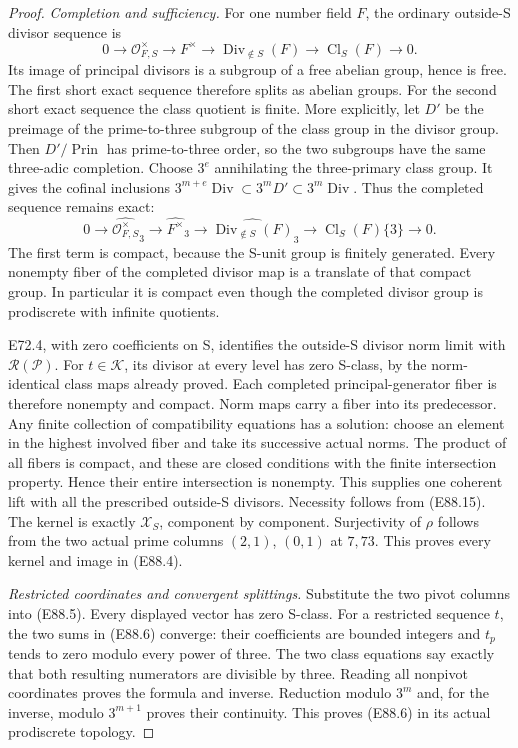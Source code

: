 \begin{proof}
\emph{Completion and sufficiency.}
For one number field $F$, the ordinary
outside-S divisor sequence is
\[
 0\longrightarrow\mathcal O_{F,S}^\times
 \longrightarrow F^\times
 \longrightarrow\operatorname{Div}_{\notin S}(F)
 \longrightarrow\operatorname{Cl}_S(F)
 \longrightarrow0.
 \tag{E88.14}
\]
Its image of principal divisors is
a subgroup of a free abelian group,
hence is free. The first short exact
sequence therefore splits as abelian
groups. For the second short exact
sequence the class quotient is finite.
More explicitly, let $D'$ be the
preimage of the prime-to-three
subgroup of the class group in
the divisor group. Then
$D'/\operatorname{Prin}$ has
prime-to-three order, so the
two subgroups have the same
three-adic completion. Choose $3^e$
annihilating the three-primary
class group. It gives the
cofinal inclusions
$3^{m+e}\operatorname{Div}\subset
3^mD'\subset3^m\operatorname{Div}$.
Thus the
completed sequence remains exact:
\[
 0\longrightarrow\widehat{\mathcal O_{F,S}^\times}_3
 \longrightarrow\widehat{F^\times}_3
 \longrightarrow\widehat{\operatorname{Div}_{\notin S}(F)}_3
 \longrightarrow\operatorname{Cl}_S(F)\{3\}
 \longrightarrow0 .
 \tag{E88.15}
\]
The first term is compact, because
the S-unit group is finitely generated.
Every nonempty fiber of the completed
divisor map is a translate of that
compact group. In particular it is
compact even though the completed
divisor group is prodiscrete with
infinite quotients.

E72.4, with zero coefficients on S,
identifies the outside-S divisor
norm limit with $\mathscr R(\mathcal P)$.
For $t\in\mathcal K$, its divisor
at every level has zero S-class,
by the norm-identical class maps
already proved. Each completed
principal-generator fiber is
therefore nonempty and compact.
Norm maps carry a fiber into its
predecessor. Any finite collection
of compatibility equations has
a solution: choose an element
in the highest involved fiber
and take its successive actual
norms. The product of all fibers
is compact, and these are closed
conditions with the finite
intersection property. Hence
their entire intersection is
nonempty. This supplies one
coherent lift with all the
prescribed outside-S divisors.
Necessity follows from (E88.15).
The kernel is exactly
$\mathcal X_S$, component by
component. Surjectivity of
$\rho$ follows from the two
actual prime columns $(2,1)$,
$(0,1)$ at $7,73$. This proves
every kernel and image in
(E88.4).

\emph{Restricted coordinates and convergent splittings.}
Substitute the two pivot columns
into (E88.5). Every displayed
vector has zero S-class.
For a restricted sequence $t$,
the two sums in (E88.6) converge:
their coefficients are bounded
integers and $t_p$ tends to zero
modulo every power of three.
The two class equations say
exactly that both resulting
numerators are divisible by
three. Reading all nonpivot
coordinates proves the formula
and inverse. Reduction modulo
$3^m$ and, for the inverse,
modulo $3^{m+1}$ proves their
continuity. This proves (E88.6)
in its actual prodiscrete topology.


\end{proof}
